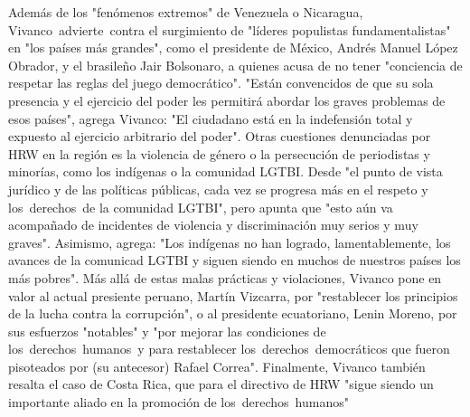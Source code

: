 \documentclass{article}%
\begin{document}
\newline%
%
Además de los "fenómenos extremos" de Venezuela o Nicaragua, Vivanco~advierte~contra el surgimiento de "líderes populistas fundamentalistas" en "los países más grandes", como el presidente de México, Andrés Manuel López Obrador, y el brasileño Jair Bolsonaro, a quienes acusa de no tener "conciencia de respetar las reglas del juego democrático".%
\newline%
%
"Están convencidos de que su sola presencia y el ejercicio del poder les permitirá abordar los graves problemas de esos países", agrega Vivanco: "El ciudadano está en la indefensión total y expuesto al ejercicio arbitrario del poder".%
\newline%
%
Otras cuestiones denunciadas por HRW en la región es la violencia de género o la persecución de periodistas y minorías, como los indígenas o la comunidad LGTBI.%
\newline%
%
Desde "el punto de vista jurídico y de las políticas públicas, cada vez se progresa más en el respeto y los~derechos~de la comunidad LGTBI", pero apunta que "esto aún va acompañado de incidentes de violencia y discriminación muy serios y muy graves".%
\newline%
%
Asimismo, agrega: "Los indígenas no han logrado, lamentablemente, los avances de la comunicad LGTBI y siguen siendo en muchos de nuestros países los más pobres".%
\newline%
%
Más allá de estas malas prácticas y violaciones, Vivanco pone en valor al actual presiente peruano, Martín Vizcarra, por "restablecer los principios de la lucha contra la corrupción", o al presidente ecuatoriano, Lenin Moreno, por sus esfuerzos "notables" y "por mejorar las condiciones de los~derechos~humanos~y para restablecer los~derechos~democráticos que fueron pisoteados por (su antecesor) Rafael Correa".%
\newline%
%
Finalmente, Vivanco también resalta el caso de Costa Rica, que para el directivo de HRW "sigue siendo un importante aliado en la promoción de los~derechos~humanos"%
\newline%
%
\end{document}
